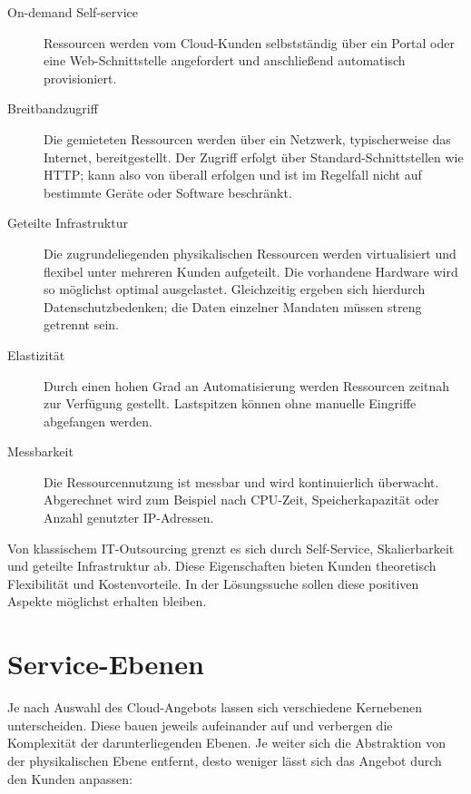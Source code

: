 \begin{description}

	\item[On-demand Self-service] Ressourcen werden vom Cloud-Kunden selbstständig über ein Portal oder eine Web-Schnittstelle angefordert und anschließend automatisch provisioniert.
	
	\item[Breitbandzugriff] Die gemieteten Ressourcen werden über ein Netzwerk, typischerweise das Internet, bereitgestellt. Der Zugriff erfolgt über Standard-Schnittstellen wie HTTP; kann also von überall erfolgen und ist im Regelfall nicht auf bestimmte Geräte oder Software beschränkt.
	
	\item[Geteilte Infrastruktur] Die zugrundeliegenden physikalischen Ressourcen werden virtualisiert und flexibel unter mehreren Kunden aufgeteilt. Die vorhandene Hardware wird so möglichst optimal ausgelastet. Gleichzeitig ergeben sich hierdurch Datenschutzbedenken; die Daten einzelner Mandaten müssen streng getrennt sein.
	
	\item[Elastizität] Durch einen hohen Grad an Automatisierung werden Ressourcen zeitnah zur Verfügung gestellt. Lastspitzen können ohne manuelle Eingriffe abgefangen werden.

	\item[Messbarkeit] Die Ressourcennutzung ist messbar und wird kontinuierlich überwacht. Abgerechnet wird zum Beispiel nach CPU-Zeit, Speicherkapazität oder Anzahl genutzter IP-Adressen.
	
\end{description}

\noindent Von klassischem IT-Outsourcing grenzt es sich durch Self-Service, Skalierbarkeit und geteilte Infrastruktur ab. Diese Eigenschaften bieten Kunden theoretisch Flexibilität und Kostenvorteile. In der Lösungssuche sollen diese positiven Aspekte möglichst erhalten bleiben.


\section{Service-Ebenen}

Je nach Auswahl des Cloud-Angebots lassen sich verschiedene Kernebenen unterscheiden. Diese bauen jeweils aufeinander auf und verbergen die Komplexität der darunterliegenden Ebenen. Je weiter sich die Abstraktion von der physikalischen Ebene entfernt, desto weniger lässt sich das Angebot durch den Kunden anpassen:

